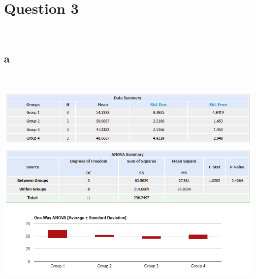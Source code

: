 \documentclass{article}
\begin{document}
\newpage

\section*{Question 3}

~

\subsection*{a}

~

\includegraphics[scale=0.5]{3a.png}
\end{document}
